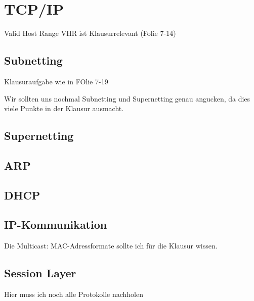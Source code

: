 \documentclass[a4paper]{article}
\title{\docTitle}
\author{Moritz}
\date{\today}
\begin{document}
\maketitle
\tableofcontents


\section{TCP/IP}

Valid Host Range VHR ist Klausurrelevant (Folie 7-14)

\subsection{Subnetting} %

Klausuraufgabe wie in FOlie 7-19

Wir sollten uns nochmal Subnetting und Supernetting genau angucken, da dies viele Punkte in der Klausur ausmacht.


\subsection{Supernetting} %



\subsection{ARP} %



\subsection{DHCP} %



\subsection{IP-Kommunikation} %


Die Multicast: MAC-Adressformate sollte ich für die Klausur wissen.

\subsection{Session Layer} %

Hier muss ich noch alle Protokolle nachholen
\end{document}

